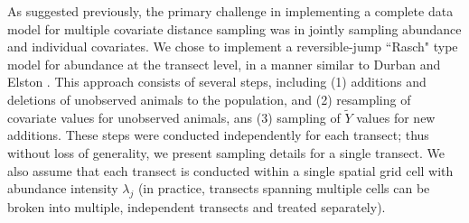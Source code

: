 \documentclass[10pt]{article}
\begin{document}
As suggested previously, the primary challenge in implementing a complete data model for multiple covariate distance sampling was in jointly sampling abundance and individual covariates.  We chose to implement a reversible-jump ``Rasch" type model for abundance at the transect level, in a manner similar to Durban and Elston \cite{DurbanElston2005}.  This approach consists of several steps, including (1) additions and deletions of unobserved animals to the population, and (2) resampling of covariate values for unobserved animals, ans (3) sampling of $\tilde{Y}$ values for new additions. These steps were conducted independently for each transect; thus without loss of generality, we present sampling details for a single transect. We also assume that each transect is conducted within a single spatial grid cell with abundance intensity $\lambda_j$ (in practice, transects spanning multiple cells can be broken into multiple, independent transects and treated separately).
\end{document}
